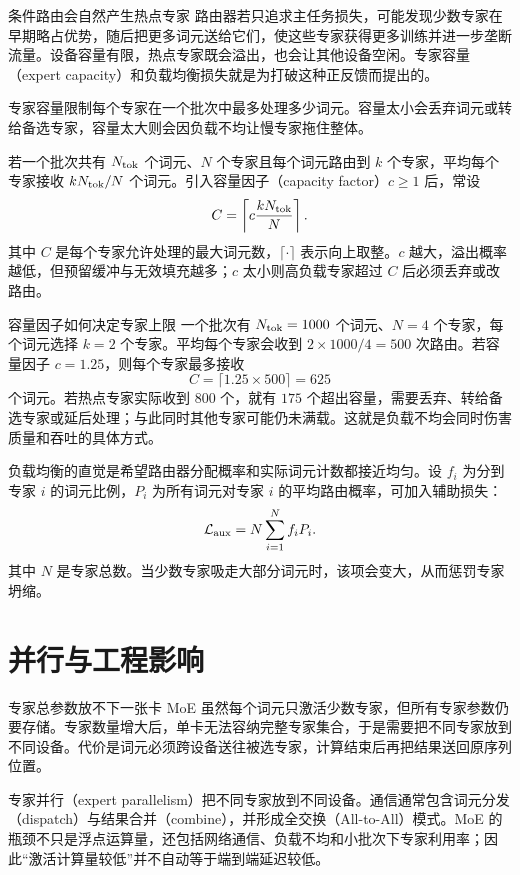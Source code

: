 \begin{motivationbox}{条件路由会自然产生热点专家}
路由器若只追求主任务损失，可能发现少数专家在早期略占优势，随后把更多词元送给它们，使这些专家获得更多训练并进一步垄断流量。设备容量有限，热点专家既会溢出，也会让其他设备空闲。专家容量（expert capacity）和负载均衡损失就是为打破这种正反馈而提出的。
\end{motivationbox}

专家容量限制每个专家在一个批次中最多处理多少词元。容量太小会丢弃词元或转给备选专家，容量太大则会因负载不均让慢专家拖住整体。

若一个批次共有 $N_{\rm tok}$ 个词元、$N$ 个专家且每个词元路由到 $k$ 个专家，平均每个专家接收 $kN_{\rm tok}/N$ 个词元。引入容量因子（capacity factor）$c\ge1$ 后，常设
\[
C=\left\lceil c\frac{kN_{\rm tok}}{N}\right\rceil.
\]
其中 $C$ 是每个专家允许处理的最大词元数，$\lceil\cdot\rceil$ 表示向上取整。$c$ 越大，溢出概率越低，但预留缓冲与无效填充越多；$c$ 太小则高负载专家超过 $C$ 后必须丢弃或改路由。

\begin{examplebox}{容量因子如何决定专家上限}
一个批次有 $N_{\rm tok}=1000$ 个词元、$N=4$ 个专家，每个词元选择 $k=2$ 个专家。平均每个专家会收到 $2\times1000/4=500$ 次路由。若容量因子 $c=1.25$，则每个专家最多接收
\[
C=\lceil1.25\times500\rceil=625
\]
个词元。若热点专家实际收到 $800$ 个，就有 $175$ 个超出容量，需要丢弃、转给备选专家或延后处理；与此同时其他专家可能仍未满载。这就是负载不均会同时伤害质量和吞吐的具体方式。
\end{examplebox}

负载均衡的直觉是希望路由器分配概率和实际词元计数都接近均匀。设 $f_i$ 为分到专家 $i$ 的词元比例，$P_i$ 为所有词元对专家 $i$ 的平均路由概率，可加入辅助损失：
\[
\mathcal L_{\rm aux}=N\sum_{i=1}^{N} f_iP_i.
\]
其中 $N$ 是专家总数。当少数专家吸走大部分词元时，该项会变大，从而惩罚专家坍缩。

\section{并行与工程影响}

\begin{motivationbox}{专家总参数放不下一张卡}
MoE 虽然每个词元只激活少数专家，但所有专家参数仍要存储。专家数量增大后，单卡无法容纳完整专家集合，于是需要把不同专家放到不同设备。代价是词元必须跨设备送往被选专家，计算结束后再把结果送回原序列位置。
\end{motivationbox}

专家并行（expert parallelism）把不同专家放到不同设备。通信通常包含词元分发（dispatch）与结果合并（combine），并形成全交换（All-to-All）模式。MoE 的瓶颈不只是浮点运算量，还包括网络通信、负载不均和小批次下专家利用率；因此“激活计算量较低”并不自动等于端到端延迟较低。

